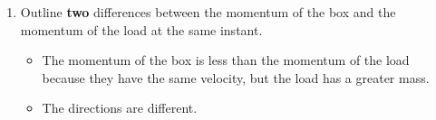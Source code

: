 \documentclass[a4paper,12pt]{article}
\begin{document}
\begin{enumerate}[label=(\alph*)]
  \item Outline \textbf{two} differences between the momentum of the box and the momentum of the load at the same instant.
        \begin{itemize}
          \item The momentum of the box is less than the momentum of the load because they have the same velocity, but the load has a greater mass.
          \item The directions are different.
        \end{itemize}
\end{enumerate}
\end{document}

